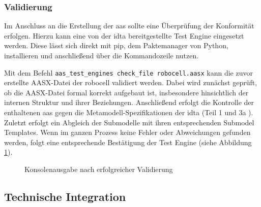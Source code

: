 \subsubsection{Validierung}
Im Anschluss an die Erstellung der \acs{aas} sollte eine Überprüfung der Konformität erfolgen.
Hierzu kann eine von der \acs{idta} bereitgestellte Test Engine \cite{TestEngine} eingesetzt werden. 
Diese lässt sich direkt mit pip, dem Paktemanager von Python, installieren und anschließend über die Kommandozeile nutzen.

Mit dem Befehl \texttt{aas\_test\_engines check\_file robocell.aasx} kann die zuvor erstellte AASX-Datei der robocell validiert werden.
Dabei wird zunächst geprüft, ob die AASX-Datei formal korrekt aufgebaut ist, insbesondere hinsichtlich der internen Struktur und ihrer Beziehungen.
Anschließend erfolgt die Kontrolle der enthaltenen \acs{aas} gegen die Metamodell-Spezifikationen der \acs{idta} (Teil 1 \cite{SpezifikationPart1} und 3a \cite{SpezifikationPart3a}).
Zuletzt erfolgt ein Abgleich der Submodelle mit ihren entsprechenden Submodel Templates.
Wenn im ganzen Prozess keine Fehler oder Abweichungen gefunden werden, folgt eine entsprechende Bestätigung der Test Engine (siehe Abbildung \ref{fig:KonsolenausgabeTestEngine}).

\setlength{\fboxsep}{0pt}
\begin{figure}[htbp]
    \centering
    \caption{Konsolenausgabe nach erfolgreicher Validierung}
    \label{fig:KonsolenausgabeTestEngine}
\end{figure}

\subsection{Technische Integration}


